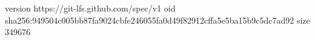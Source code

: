 version https://git-lfs.github.com/spec/v1
oid sha256:949504c005bb87fa9024cbfe246055fa0d49f82912cffa5e5ba15b9c5dc7ad92
size 349676
